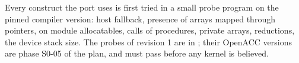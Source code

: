 \begin{portnote}
Every construct the port uses is first tried in a small probe program on the pinned compiler version: 
host fallback, presence of arrays mapped through pointers,  on module allocatables, calls of
 procedures, private arrays, reductions, the device stack size. The probes of revision 1 are in
; their OpenACC versions are phase S0-05 of the plan, and must pass before any kernel
is believed.
\end{portnote}
